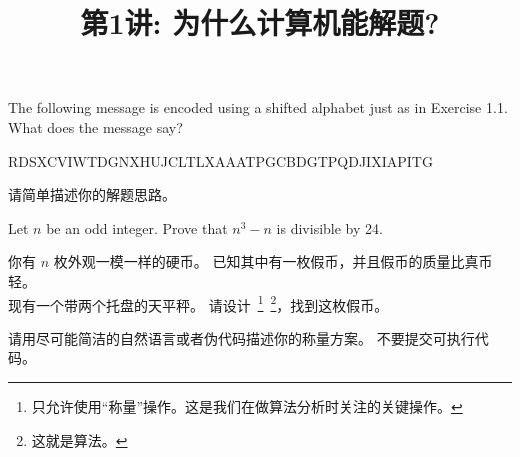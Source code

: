 \documentclass[a4paper, justified]{tufte-handout}
\title{第1讲: 为什么计算机能解题?}
\date{\zhtoday} %
\begin{document}
\maketitle
\noplagiarism %
\begin{abstract}
  \begin{center}{}
  \end{center}
\end{abstract}
\beginrequired

\begin{problem}[UD Problem $1.6$]
  The following message is encoded using a shifted alphabet just as in Exercise 1.1. 
  What does the message say?  
  
  RDSXCVIWTDGNXHUJCLTLXAAATPGCBDGTPQDJIXIAPITG

  请简单描述你的解题思路。
\end{problem}

\begin{solution}
\end{solution}

\begin{problem}[UD Problem $1.9$]
  Let $n$ be an odd integer. Prove that $n^3 − n$ is divisible by 24.
\end{problem}

\begin{solution}
\end{solution}

\begin{problem}[$n$ 枚硬币]

  你有 $n$ 枚外观一模一样的硬币。
  已知其中有一枚假币，并且假币的质量比真币轻。\\
  现有一个带两个托盘的天平秤。
  请设计~\footnote{只允许使用``称量''操作。这是我们在做算法分析时关注的关键操作。}~\footnote{这就是算法。}，找到这枚假币。

  请用尽可能简洁的自然语言或者伪代码描述你的称量方案。
  不要提交可执行代码。
\end{problem}
\end{document}
